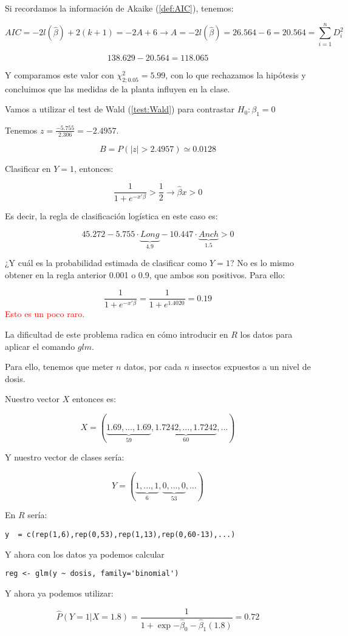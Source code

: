 \begin{problem}[3]
Si recordamos la información de Akaike (\ref{def:AIC}), tenemos:

	\[AIC = -2l(\hat{β}) + 2(k+1) = -2A  + 6 \to A = -2l(\hat{β}) = 26.564 - 6 =  20.564 =  \sum_{i=1}^{n} D_i^2\]

\spart \[138.629 - 20.564 = 118.065\]

Y comparamos este valor con $\chi^2_{2;0.05} = 5.99$, con lo que rechazamos la hipótesis y concluimos que las medidas de la planta influyen en la clase.

\spart Vamos a utilizar el test de Wald (\ref{test:Wald}) para contrastar $H_0 : β_1 = 0$

Tenemos $z = \frac{-5.755}{2.306} = -2.4957$.

\[B = P(|z| > 2.4957) \simeq 0.0128\]

\spart Clasificar en $Y=1$, entonces:

\[
	\frac{1}{1+e^{-x'β}} > \frac{1}{2} \to \hat{β}x > 0
\]

Es decir, la regla de clasificación logística en este caso es:

\[
45.272 - 5.755·\underbrace{Long}_{4.9} - 10.447 · \underbrace{Anch}_{1.5} > 0
\]

\obs ¿Y cuál es la probabilidad estimada de clasificar como $Y=1$?  No es lo mismo obtener en la regla anterior 0.001 o 0.9, que ambos son positivos. Para ello:

\[
	\frac{1}{1+e^{-x'β}} = \frac{1}{1+e^{1.4020}} = 0.19
\]
\textcolor{red}{Esto es un poco raro.}

\end{problem}

\begin{problem}[4]


\solution
La dificultad de este problema radica en cómo introducir en $R$ los datos para aplicar el comando $glm$.

Para ello, tenemos que meter $n$ datos, por cada $n$ insectos expuestos a un nivel de dosis.

Nuestro vector $X$ entonces es:

\[X = \left( \underbrace{1.69, ... , 1.69}_{59}, \underbrace{1.7242,...,1.7242}_{60}, ... \right)\]

Y nuestro vector de clases sería:

\[
Y = \left( \underbrace{1,...,1}_{6}, \underbrace{0,...,0}_{53}, ... \right)
\]


En $R$ sería:

\begin{lstlisting}[style=mystyle]
y  = c(rep(1,6),rep(0,53),rep(1,13),rep(0,60-13),...)
\end{lstlisting}

Y ahora con los datos ya podemos calcular
\begin{lstlisting}[style=mystyle]
reg <- glm(y ~ dosis, family='binomial')
\end{lstlisting}

Y ahora ya podemos utilizar:

	\[\hat{P}(Y=1 | X=1.8) = \frac{1}{1+\exp{-\hat{β}_0 - \hat{β}_1(1.8)}} = 0.72\]

\end{problem}



